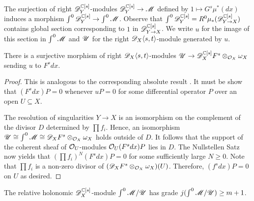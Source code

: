   The surjection of right $\mathscr{D}_Y^{\mathbb{C}[s]}$-modules $\mathscr{D}_Y^{\mathbb{C}[s]}\to \mathscr{M}$ defined by $1\mapsto G^s \mu^*(dx)$ induces a morphism $\int^0 \mathscr{D}_Y^{\mathbb{C}[s]} \to \int^0\mathscr{M}$.
  Observe that $\int^0 \mathscr{D}_Y^{\mathbb{C}[s]} = R^0\mu_*(\mathscr{D}_{Y\to X}^{\mathbb{C}[s]})$ contains global section corresponding to $1$ in $\mathscr{D}_{Y\to X}^{\mathbb{C}[s]}$.
  We write $u$ for the image of this section in $\int^0 \mathscr{M}$ and $\mathscr{U}$ for the right $\mathscr{D}_X\langle s,t\rangle$-module generated by $u$.
  \begin{lemma}\label{lem: SurjectionUF}
  There is a surjective morphism of right $\mathscr{D}_X\langle s,t \rangle$-modules $\mathscr{U}\to \mathscr{D}_X^{\mathbb{C}[s]}F^s \otimes_{\mathcal{O}_X}\omega_X$ sending $u$ to $F^sdx$.
\end{lemma}
\begin{proof}
  This is analogous to the corresponding absolute result \cite[Chapter 5, p246]{bjork1979rings}. It must be show that $(F^s dx)P = 0$ whenever $uP = 0$ for some differential operator $P$ over an open $U\subseteq X$.

  The resolution of singularities $Y\to X$ is an isomorphism on the complement of the divisor $D$ determined by $\prod f_i$.
  Hence, an isomorphism $\mathscr{U} \cong \int^0 \mathscr{M} \cong  \mathscr{D}_X F^s  \otimes_{\mathcal{O}_X}\omega_X$ holds outside of $D$.
  It follows that the support of the coherent sheaf of $\mathcal{O}_U$-modules $\mathcal{O}_U (F^s dx) P $ lies in $D$.
  The Nullstellen Satz now yields that $(\prod f_i)^N (F^s dx) P  = 0$ for some sufficiently large $N\geq 0$.
  Note that $\prod f_i$ is a non-zero divisor of $(\mathscr{D}_X F^s\otimes_{\mathcal{O}_X} \omega_X)(U)$.
  Therefore, $(f^s dx) P= 0$ on $U$ as desired.
\end{proof}
\begin{lemma}\label{lem: GradeNPlusOne}
  The relative holonomic $\mathscr{D}_X^{\mathbb{C}[s]}$-module $\int^0\mathscr{M}/\mathscr{U}$ has grade $j(\int^0\mathscr{M}/\mathscr{U})\geq m+1$.
\end{lemma}
